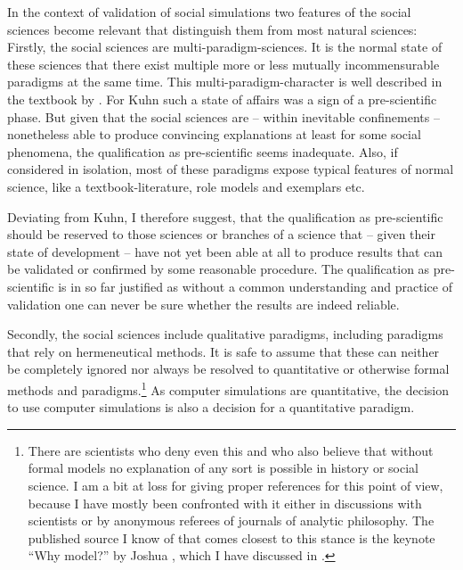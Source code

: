 \documentclass[12pt, a4paper]{article}
\begin{document}
In the context of validation of social simulations two features of the
social sciences become relevant that distinguish them from most
natural sciences: Firstly, the social sciences are
multi-paradigm-sciences. It is the normal state of these sciences that
there exist multiple more or less mutually incommensurable paradigms
at the same time. This multi-paradigm-character is well described in
the textbook by \citet{moses-knutsen:2012}. For Kuhn such a state of
affairs was a sign of a pre-scientific phase. But given that the
social sciences are -- within inevitable confinements -- nonetheless
able to produce convincing explanations at least for some social
phenomena, the qualification as pre-scientific seems inadequate. Also,
if considered in isolation, most of these paradigms expose typical
features of normal science, like a textbook-literature, role models
and exemplars etc.

Deviating from Kuhn, I therefore suggest, that the qualification as
pre-scientific should be reserved to those sciences or branches of a
science that -- given their state of development -- have not yet been
able at all to produce results that can be validated or confirmed by
some reasonable procedure. The qualification as pre-scientific is in
so far justified as without a common understanding and practice of
validation one can never be sure whether the results are indeed
reliable.

Secondly, the social sciences include qualitative paradigms, including
paradigms that rely on hermeneutical methods. It is safe to assume
that these can neither be completely ignored nor always be resolved to
quantitative or otherwise formal methods and paradigms.\footnote{There
are scientists who deny even this and who also believe that without
formal models no explanation of any sort is possible in history or
social science. I am a bit at loss for giving proper references for
this point of view, because I have mostly been confronted with it
either in discussions with scientists or by anonymous referees of
journals of analytic philosophy. The published source I know of that
comes closest to this stance is the keynote ``Why model?'' by Joshua
\citet{epstein:2008}, which I have discussed in \citet{arnold:2014}.}
As computer simulations are quantitative, the decision to use computer
simulations is also a decision for a quantitative paradigm.
\end{document}
